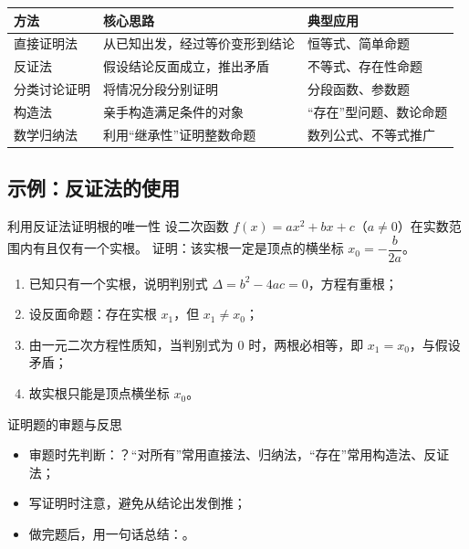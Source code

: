 \documentclass[a4paper,11pt]{ctexart}
\begin{document}
\begin{center}

\vspace{0.5em}
\begin{tabular}{p{} p{} p{}}
\hline
\textbf{方法} & \textbf{核心思路} & \textbf{典型应用} \\
\hline
直接证明法 & 从已知出发，经过等价变形到结论 & 恒等式、简单命题 \\
反证法 & 假设结论反面成立，推出矛盾 & 不等式、存在性命题 \\
分类讨论证明 & 将情况分段分别证明 & 分段函数、参数题 \\
构造法 & 亲手构造满足条件的对象 & “存在”型问题、数论命题 \\
数学归纳法 & 利用“继承性”证明整数命题 & 数列公式、不等式推广 \\
\hline
\end{tabular}
\end{center}

\subsection{示例：反证法的使用}

\begin{examplebox}{利用反证法证明根的唯一性}
设二次函数 $f(x)=ax^2+bx+c$（$a\ne 0$）在实数范围内有且仅有一个实根。
证明：该实根一定是顶点的横坐标 $x_0=-\dfrac{b}{2a}$。

\begin{enumerate}
  \item 已知只有一个实根，说明判别式 $\Delta=b^2-4ac=0$，方程有重根；
  \item 设反面命题：存在实根 $x_1$，但 $x_1\ne x_0$；
  \item 由一元二次方程性质知，当判别式为 $0$ 时，两根必相等，即 $x_1=x_0$，与假设矛盾；
  \item 故实根只能是顶点横坐标 $x_0$。
\end{enumerate}
\end{examplebox}

\begin{summarybox}{证明题的审题与反思}
\begin{itemize}
  \item 审题时先判断：？“对所有”常用直接法、归纳法，“存在”常用构造法、反证法；
  \item 写证明时注意，避免从结论出发倒推；
  \item 做完题后，用一句话总结：。
\end{itemize}
\end{summarybox}
\end{document}
